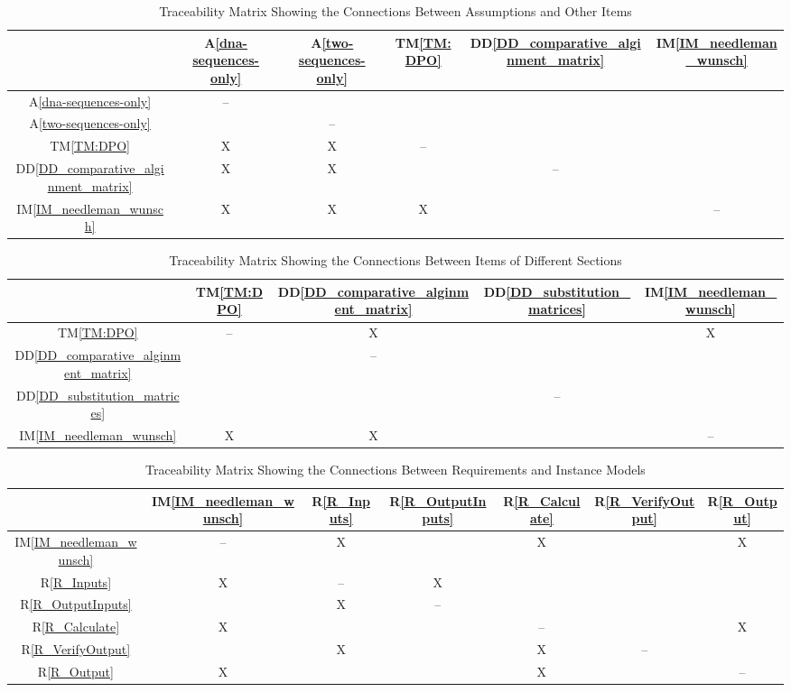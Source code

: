 \documentclass[12pt]{article}
\newcommand{\ddref}[1]{DD\ref{#1}}
\newcommand{\tref}[1]{TM\ref{#1}}
\newcommand{\aref}[1]{A\ref{#1}}
\newcommand{\iref}[1]{IM\ref{#1}}
\newcommand{\rref}[1]{R\ref{#1}}
\begin{document}
\begin{table}[h!]
\centering

\begin{tabular}{|c|c|c|c|c|c|}
\hline
  & \aref{dna-sequences-only}& \aref{two-sequences-only}& \tref{TM:DPO}& \ddref{DD_comparative_alginment_matrix}& \iref{IM_needleman_wunsch}\\
\hline
\aref{dna-sequences-only} & --&  &  &  &  \\ \hline
\aref{two-sequences-only} &  & --&  &  &  \\ \hline
\tref{TM:DPO} & X & X & --&  &  \\ \hline
\ddref{DD_comparative_alginment_matrix} & X & X &  & --&  \\ \hline
\iref{IM_needleman_wunsch} & X & X & X &  & --\\
\hline
\end{tabular}


\caption{Traceability Matrix Showing the Connections Between Assumptions and Other Items}
\label{Table:A_trace}
\end{table}


\begin{table}[h!]
\centering
\begin{tabular}{|c|c|c|c|c|}
\hline        
  & \tref{TM:DPO} & \ddref{DD_comparative_alginment_matrix} & \ddref{DD_substitution_matrices} & \iref{IM_needleman_wunsch} \\ \hline
\tref{TM:DPO} & -- & X &   & X \\ \hline
\ddref{DD_comparative_alginment_matrix} &   & -- &   &   \\ \hline
\ddref{DD_substitution_matrices} &   &   & -- &   \\ \hline
\iref{IM_needleman_wunsch} & X & X &   & -- \\ \hline
\end{tabular}
\caption{Traceability Matrix Showing the Connections Between Items of Different Sections}
\label{Table:trace}
\end{table}


\begin{table}[h!]
\centering
\begin{tabular}{|c|c|c|c|c|c|c|}
\hline
  & \iref{IM_needleman_wunsch} & \rref{R_Inputs} & \rref{R_OutputInputs} & \rref{R_Calculate} & \rref{R_VerifyOutput} & \rref{R_Output} \\ \hline
\iref{IM_needleman_wunsch} & -- & X & & X & & X \\ \hline
\rref{R_Inputs} & X & -- & X & & & \\ \hline
\rref{R_OutputInputs} & & X & -- & & & \\ \hline
\rref{R_Calculate} & X & & & -- & & X \\ \hline
\rref{R_VerifyOutput} & & X & & X & -- & \\ \hline
\rref{R_Output} & X & & & X & & -- \\ \hline
\end{tabular}
\caption{Traceability Matrix Showing the Connections Between Requirements and Instance Models}
\label{Table:R_trace}
\end{table}
\end{document}
